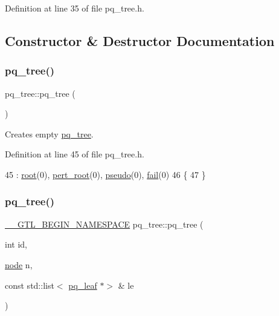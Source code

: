 Definition at line 35 of file pq\+\_\+tree.\+h.



\subsection{Constructor \& Destructor Documentation}
\mbox{\label{classpq__tree_afea06921780eb07ddb36294b109964d0}} 
\subsubsection{\texorpdfstring{pq\+\_\+tree()}{pq\_tree()}\hspace{0.1cm}{\footnotesize\ttfamily [1/2]}}
{\footnotesize\ttfamily pq\+\_\+tree\+::pq\+\_\+tree (\begin{DoxyParamCaption}{ }\end{DoxyParamCaption})\hspace{0.3cm}{\ttfamily [inline]}}



Creates empty \mbox{\hyperlink{classpq__tree}{pq\+\_\+tree}}. 



Definition at line 45 of file pq\+\_\+tree.\+h.


\begin{DoxyCode}
45               : \mbox{\hyperlink{classpq__tree_ad8e4e2235fe68fb99769cec54e1760ba}{root}}(0), \mbox{\hyperlink{classpq__tree_adf0d16ca5a29bfbe863efb525135ac01}{pert\_root}}(0), \mbox{\hyperlink{classpq__tree_a036ce0ebe9f5129d5c4ad930bbcc3e6f}{pseudo}}(0), \mbox{\hyperlink{classpq__tree_a4e0a0e6d74a8ac062acf3a05723a35f2}{fail}}(0)
46     \{
47     \}
\end{DoxyCode}
\mbox{\label{classpq__tree_a417e48f22a3be82238916fe95ce9c840}} 
\subsubsection{\texorpdfstring{pq\+\_\+tree()}{pq\_tree()}\hspace{0.1cm}{\footnotesize\ttfamily [2/2]}}
{\footnotesize\ttfamily \mbox{\hyperlink{_g_t_l_8h_a2d9f24096ac60918452dd51f32b64aa9}{\+\_\+\+\_\+\+G\+T\+L\+\_\+\+B\+E\+G\+I\+N\+\_\+\+N\+A\+M\+E\+S\+P\+A\+CE}} pq\+\_\+tree\+::pq\+\_\+tree (\begin{DoxyParamCaption}\item[{int}]{id,  }\item[{\mbox{\hyperlink{classnode}{node}}}]{n,  }\item[{const std\+::list$<$ \mbox{\hyperlink{classpq__leaf}{pq\+\_\+leaf}} $\ast$$>$ \&}]{le }\end{DoxyParamCaption})}



